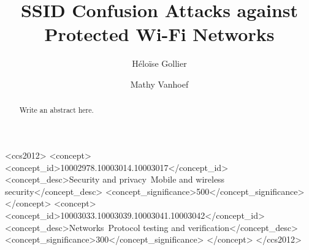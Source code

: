\documentclass[sigconf,review]{acmart}
\newcommand{\wifi}{\mbox{Wi-Fi}}
\begin{document}
\title{SSID Confusion Attacks against Protected \wifi{} Networks}

\author{Héloïse Gollier}

\author{Mathy Vanhoef}

\renewcommand{\shortauthors}{Mathy Vanhoef, Xianjun Jiao, Wei Liu \& Ingrid Moerman}

\begin{CCSXML}
<ccs2012>
   <concept>
       <concept_id>10002978.10003014.10003017</concept_id>
       <concept_desc>Security and privacy~Mobile and wireless security</concept_desc>
       <concept_significance>500</concept_significance>
       </concept>
   <concept>
       <concept_id>10003033.10003039.10003041.10003042</concept_id>
       <concept_desc>Networks~Protocol testing and verification</concept_desc>
       <concept_significance>300</concept_significance>
       </concept>
 </ccs2012>
\end{CCSXML}





\begin{abstract}
Write an abstract here.
\end{abstract}
\end{document}
